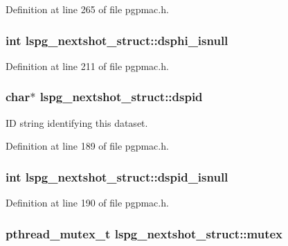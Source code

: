 Definition at line 265 of file pgpmac.\-h.

\hypertarget{structlspg__nextshot__struct_a2d1f51cb1bb575a214344773136be878}{
\subsubsection[{dsphi\-\_\-isnull}]{\setlength{\rightskip}{0pt plus 5cm}int lspg\-\_\-nextshot\-\_\-struct\-::dsphi\-\_\-isnull}}\label{structlspg__nextshot__struct_a2d1f51cb1bb575a214344773136be878}


Definition at line 211 of file pgpmac.\-h.

\hypertarget{structlspg__nextshot__struct_a4487e718c2b55a8ab9ebb18329574ae1}{
\subsubsection[{dspid}]{\setlength{\rightskip}{0pt plus 5cm}char$\ast$ lspg\-\_\-nextshot\-\_\-struct\-::dspid}}\label{structlspg__nextshot__struct_a4487e718c2b55a8ab9ebb18329574ae1}


I\-D string identifying this dataset. 



Definition at line 189 of file pgpmac.\-h.

\hypertarget{structlspg__nextshot__struct_a7665485395487756ab448d0c81c84d10}{
\subsubsection[{dspid\-\_\-isnull}]{\setlength{\rightskip}{0pt plus 5cm}int lspg\-\_\-nextshot\-\_\-struct\-::dspid\-\_\-isnull}}\label{structlspg__nextshot__struct_a7665485395487756ab448d0c81c84d10}


Definition at line 190 of file pgpmac.\-h.

\hypertarget{structlspg__nextshot__struct_a38b657155fbee9b73278f76912cf2333}{
\subsubsection[{mutex}]{\setlength{\rightskip}{0pt plus 5cm}pthread\-\_\-mutex\-\_\-t lspg\-\_\-nextshot\-\_\-struct\-::mutex}}\label{structlspg__nextshot__struct_a38b657155fbee9b73278f76912cf2333}


